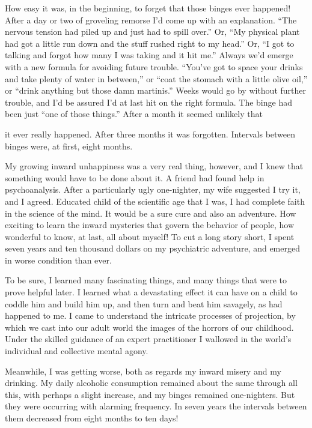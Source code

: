 How easy it was, in the beginning, to forget that those binges ever happened! After a day or two of groveling remorse I’d come up with an explanation. “The nervous tension had piled up and just had to spill over.” Or, “My physical plant had got a little run down and the stuff rushed right to my head.” Or, “I got to talking and forgot how many I was taking and it hit me.” Always we’d emerge with a new formula for avoiding future trouble. “You’ve got to space your drinks and take plenty of water in between,” or “coat the stomach with a little olive oil,” or “drink anything but those damn martinis.” Weeks would go by without further trouble, and I’d be assured I’d at last hit on the right formula. The binge had been just “one of those things.” After a month it seemed unlikely that

it ever really happened. After three months it was forgotten. Intervals between binges were, at first, eight months.

My growing inward unhappiness was a very real thing, however, and I knew that something would have to be done about it. A friend had found help in psychoanalysis. After a particularly ugly one-nighter, my wife suggested I try it, and I agreed. Educated child of the scientific age that I was, I had complete faith in the science of the mind. It would be a sure cure and also an adventure. How exciting to learn the inward mysteries that govern the behavior of people, how wonderful to know, at last, all about myself! To cut a long story short, I spent seven years and ten thousand dollars on my psychiatric adventure, and emerged in worse condition than ever.

To be sure, I learned many fascinating things, and many things that were to prove helpful later. I learned what a devastating effect it can have on a child to coddle him and build him up, and then turn and beat him savagely, as had happened to me. I came to understand the intricate processes of projection, by which we cast into our adult world the images of the horrors of our childhood. Under the skilled guidance of an expert practitioner I wallowed in the world’s individual and collective mental agony.

Meanwhile, I was getting worse, both as regards my inward misery and my drinking. My daily alcoholic consumption remained about the same through all this, with perhaps a slight increase, and my binges remained one-nighters. But they were occurring with alarming frequency. In seven years the intervals between them decreased from eight months to ten days!

